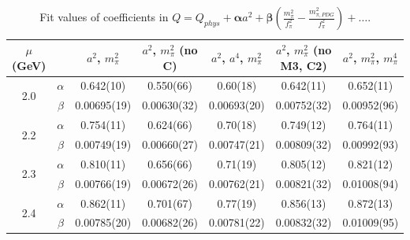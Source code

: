 \documentclass[12pt]{extarticle}
\begin{document}
\begin{table}[h!]
\begin{center}
\begin{tabular}{|c c|c|c|c|c|c|}
\hline
$\mu$ (GeV) &  & $a^2$, $m_\pi^2$& $a^2$, $m_\pi^2$ (no C)& $a^2$, $a^4$, $m_\pi^2$& $a^2$, $m_\pi^2$ (no M3, C2)& $a^2$, $m_\pi^2$, $m_\pi^4$\\
\hline
\multirow{2}{0.5in}{2.0} & $\alpha$ & 0.642(10)& 0.550(66)& 0.60(18)& 0.642(11)& 0.652(11)\\
 & $\beta$ & 0.00695(19)& 0.00630(32)& 0.00693(20)& 0.00752(32)& 0.00952(96)\\
\hline
\multirow{2}{0.5in}{2.2} & $\alpha$ & 0.754(11)& 0.624(66)& 0.70(18)& 0.749(12)& 0.764(11)\\
 & $\beta$ & 0.00749(19)& 0.00660(27)& 0.00747(21)& 0.00809(32)& 0.00992(93)\\
\hline
\multirow{2}{0.5in}{2.3} & $\alpha$ & 0.810(11)& 0.656(66)& 0.71(19)& 0.805(12)& 0.821(12)\\
 & $\beta$ & 0.00766(19)& 0.00672(26)& 0.00762(21)& 0.00821(32)& 0.01008(94)\\
\hline
\multirow{2}{0.5in}{2.4} & $\alpha$ & 0.862(11)& 0.701(67)& 0.77(19)& 0.856(13)& 0.872(13)\\
 & $\beta$ & 0.00785(20)& 0.00682(26)& 0.00781(22)& 0.00832(32)& 0.01009(95)\\
\hline
\end{tabular}
\caption{Fit values of coefficients in $Q = Q_{phys} + \mathbf{\alpha} a^2 + \mathbf{\beta}\left(\frac{m_\pi^2}{f_\pi^2}-\frac{m_{\pi,PDG}^2}{f_\pi^2}\right) + \ldots$.}
\end{center}
\end{table}




















\clearpage
\end{document}
